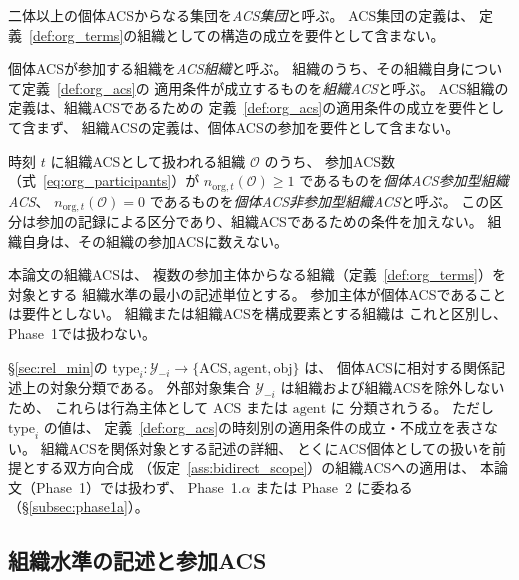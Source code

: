\begin{definition}
\label{def:org_class_terms}
二体以上の個体ACSからなる集団を\emph{ACS集団}と呼ぶ。
ACS集団の定義は、
定義~\ref{def:org_terms}の組織としての構造の成立を要件として含まない。

個体ACSが参加する組織を\emph{ACS組織}と呼ぶ。
組織のうち、その組織自身について定義~\ref{def:org_acs}の
適用条件が成立するものを\emph{組織ACS}と呼ぶ。
ACS組織の定義は、組織ACSであるための
定義~\ref{def:org_acs}の適用条件の成立を要件として含まず、
組織ACSの定義は、個体ACSの参加を要件として含まない。

時刻 $t$ に組織ACSとして扱われる組織 $\mathcal O$ のうち、
参加ACS数（式~\eqref{eq:org_participants}）が
$n_{\mathrm{org},t}(\mathcal O)\geq1$ であるものを\emph{個体ACS参加型組織ACS}、
$n_{\mathrm{org},t}(\mathcal O)=0$ であるものを\emph{個体ACS非参加型組織ACS}と呼ぶ。
この区分は参加の記録による区分であり、組織ACSであるための条件を加えない。
組織自身は、その組織の参加ACSに数えない。
\end{definition}

\begin{remark}[組織ACSの記述単位]
\label{rem:org_acs_unit}
本論文の組織ACSは、
複数の参加主体からなる組織（定義~\ref{def:org_terms}）を対象とする
組織水準の最小の記述単位とする。
参加主体が個体ACSであることは要件としない。
組織または組織ACSを構成要素とする組織は
これと区別し、Phase~1では扱わない。
\end{remark}

\begin{remark}[組織と関係対象分類]
\label{rem:org_terms_nonimplication}
\S\ref{sec:rel_min}の
$\mathrm{type}_i:\mathcal Y_{-i}\to
\{\mathrm{ACS},\mathrm{agent},\mathrm{obj}\}$ は、
個体ACSに相対する関係記述上の対象分類である。
外部対象集合 $\mathcal Y_{-i}$ は組織および組織ACSを除外しないため、
これらは行為主体として $\mathrm{ACS}$ または $\mathrm{agent}$ に
分類されうる。
ただし $\mathrm{type}_i$ の値は、
定義~\ref{def:org_acs}の時刻別の適用条件の成立・不成立を表さない。
組織ACSを関係対象とする記述の詳細、
とくにACS個体としての扱いを前提とする双方向合成
（仮定~\ref{ass:bidirect_scope}）の組織ACSへの適用は、
本論文（Phase~1）では扱わず、
Phase~1.$\alpha$ または Phase~2 に委ねる（\S\ref{subsec:phase1a}）。
\end{remark}

\subsection{組織水準の記述と参加ACS}
\label{subsec:org_structure}

